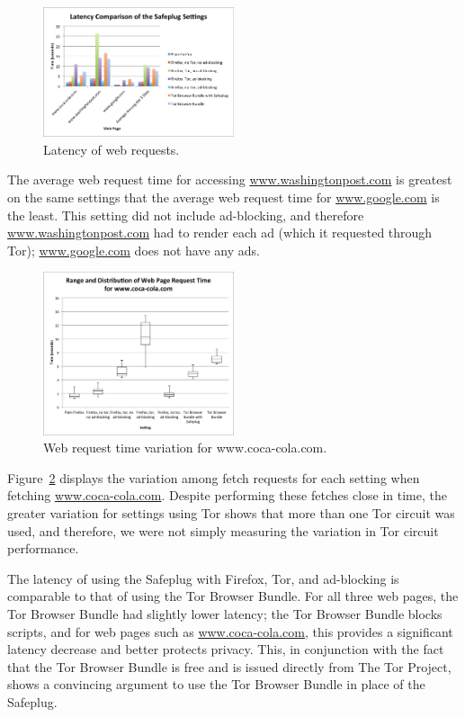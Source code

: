 \documentclass[letterpaper,twocolumn,10pt]{article}
\begin{document}
\begin{figure}
  \centering
  \includegraphics[width=0.5\textwidth]{latencygraph}
  \caption{Latency of web requests.}
  \label{fig:latency2}
\end{figure}

The average web request time for accessing \url{www.washingtonpost.com} is greatest on the same settings that the average web request time for \url{www.google.com} is the least. This setting did not include ad-blocking, and therefore \url{www.washingtonpost.com} had to render each ad (which it requested through Tor); \url{www.google.com} does not have any ads.

\begin{figure}
  \centering
  \includegraphics[width=0.5\textwidth]{rangeanddistcocacola}
  \caption{Web request time variation for www.coca-cola.com.}
  \label{fig:boxandwhisker}
\end{figure}

Figure~\ref{fig:boxandwhisker} displays the variation among fetch requests for each setting when fetching \url{www.coca-cola.com}.  Despite performing these fetches close in time, the greater variation for settings using Tor shows that more than one Tor circuit was used, and therefore, we were not simply measuring the variation in Tor circuit performance.  

The latency of using the Safeplug with Firefox, Tor, and ad-blocking is comparable to that of using the Tor Browser Bundle.  For all three web pages, the Tor Browser Bundle had slightly lower latency; the Tor Browser Bundle blocks scripts, and for web pages such as \url{www.coca-cola.com}, this provides a significant latency decrease and better protects privacy.  This, in conjunction with the fact that the Tor Browser Bundle is free and is issued directly from The Tor Project, shows a convincing argument to use the Tor Browser Bundle in place of the Safeplug.  
\end{document}
